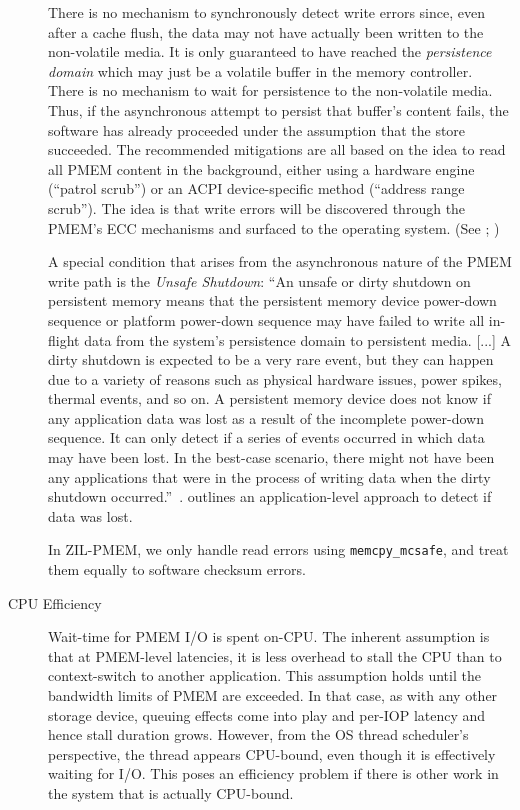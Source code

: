 \documentclass[12pt,a4paper,twoside]{book}
\begin{document}
\begin{description}
        There is no mechanism to synchronously detect write errors since, even after a cache flush, the data may not have actually been written to the non-volatile media.
        It is only guaranteed to have reached the \textit{persistence domain} which may just be a volatile buffer in the memory controller.
        There is no mechanism to wait for persistence to the non-volatile media.
        Thus, if the asynchronous attempt to persist that buffer's content fails, the software has already proceeded under the assumption that the store succeeded.
        The recommended mitigations are all based on the idea to read all PMEM content in the background, either using a hardware engine (``patrol scrub'') or an ACPI device-specific method (``address range scrub'').
        The idea is that write errors will be discovered through the PMEM's ECC mechanisms and surfaced to the operating system.
        (See \cite{ReliabilityAvailabilityServiceability}; \cite[Chapter 17]{Scargall2020})

        A special condition that arises from the asynchronous nature of the PMEM write path is the \textit{Unsafe Shutdown}:
        ``An unsafe or dirty shutdown on persistent memory means that the persistent memory
        device power-down sequence or platform power-down sequence may have failed
        to write all in-flight data from the system’s persistence domain to persistent media.
        [...] A dirty shutdown is expected to be a very
        rare event, but they can happen due to a variety of reasons such as physical hardware
        issues, power spikes, thermal events, and so on.
        A persistent memory device does not know if any application data was lost as a result
        of the incomplete power-down sequence. It can only detect if a series of events occurred
        in which data may have been lost. In the best-case scenario, there might not have been
        any applications that were in the process of writing data when the dirty shutdown
        occurred.''~\cite[Chapter 17]{Scargall2020}.
        \citeauthor{Scargall2020}\cite{Scargall2020} outlines an application-level approach to detect if data was lost.

        In ZIL-PMEM, we only handle read errors using \lstinline{memcpy_mcsafe}, and treat them equally to software checksum errors.

    \item[CPU Efficiency] Wait-time for PMEM I/O is spent on-CPU.
        The inherent assumption is that at PMEM-level latencies, it is less overhead to stall the CPU than to context-switch to another application.
        This assumption holds until the bandwidth limits of PMEM are exceeded.
        In that case, as with any other storage device, queuing effects come into play and per-IOP latency and hence stall duration grows.
        However, from the OS thread scheduler's perspective, the thread appears CPU-bound, even though it is effectively waiting for I/O.
        This poses an efficiency problem if there is other work in the system that is actually CPU-bound.


\end{description}
\end{document}
